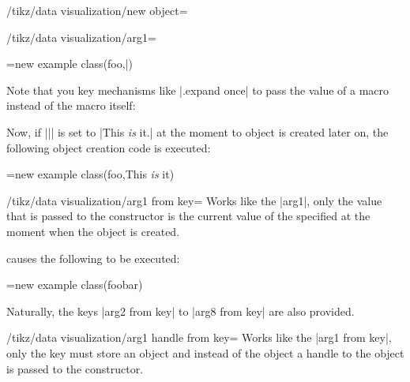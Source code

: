 \begin{key}{/tikz/data visualization/new object=}
\begin{key}{/tikz/data visualization/arg1=}
\begin{codeexample}
\pgfoonew \tikzdvobj=new example class(foo,\bar)
\end{codeexample}
        Note that you key mechanisms like |.expand once| to pass the value of a
        macro instead of the macro itself:
\begin{codeexample}
\end{codeexample}
        Now, if |\bar| is set to |This \emph{is} it.| at the moment to object
        is created later on, the following object creation code is executed:
\begin{codeexample}
\pgfoonew \tikzdvobj=new example class(foo,This \emph{is} it)
\end{codeexample}
    \end{key}

    \begin{key}{/tikz/data visualization/arg1 from key=}
        Works like the |arg1|, only the value that is passed to the constructor
        is the current value of the specified  at the moment when the
        object is created.
\begin{codeexample}
\tikzset{some key/.initial=foobar}
\end{codeexample}
        causes the following to be executed:
\begin{codeexample}
\pgfoonew \tikzdvobj=new example class(foobar)
\end{codeexample}
        Naturally, the keys |arg2 from key| to |arg8 from key| are also
        provided.
    \end{key}

    \begin{key}{/tikz/data visualization/arg1 handle from key=}
        Works like the |arg1 from key|, only the key must store an object and
        instead of the object a handle to the object is passed to the
        constructor.
    \end{key}
\end{key}

